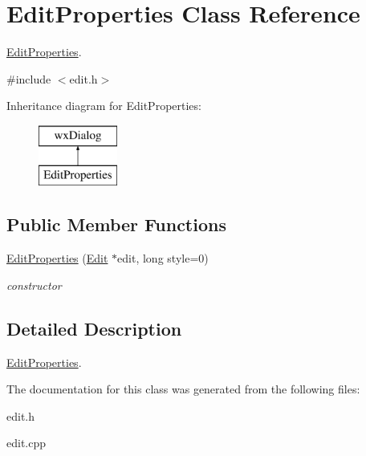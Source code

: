 \hypertarget{class_edit_properties}{\section{Edit\+Properties Class Reference}
\label{class_edit_properties}
}


\hyperlink{class_edit_properties}{Edit\+Properties}.  




{\ttfamily \#include $<$edit.\+h$>$}

Inheritance diagram for Edit\+Properties\+:\begin{figure}[H]
\begin{center}
\leavevmode
\includegraphics[height=2.000000cm]{class_edit_properties}
\end{center}
\end{figure}
\subsection*{Public Member Functions}
\begin{DoxyCompactItemize}
\item 
\hypertarget{class_edit_properties_ad3cf2454738d0e76238dfbcb0fb3b7ff}{\hyperlink{class_edit_properties_ad3cf2454738d0e76238dfbcb0fb3b7ff}{Edit\+Properties} (\hyperlink{class_edit}{Edit} $\ast$edit, long style=0)}\label{class_edit_properties_ad3cf2454738d0e76238dfbcb0fb3b7ff}

\begin{DoxyCompactList}\small\item\em constructor \end{DoxyCompactList}\end{DoxyCompactItemize}


\subsection{Detailed Description}
\hyperlink{class_edit_properties}{Edit\+Properties}. 

The documentation for this class was generated from the following files\+:\begin{DoxyCompactItemize}
\item 
edit.\+h\item 
edit.\+cpp\end{DoxyCompactItemize}
